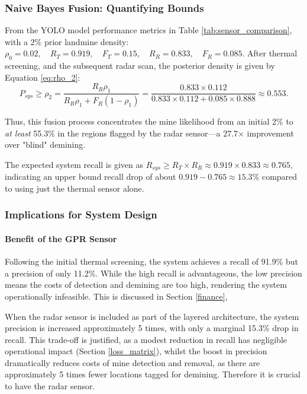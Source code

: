     \subsubsection{Naive Bayes Fusion: Quantifying Bounds}
    
        From the YOLO model performance metrics in Table \ref{tab:sensor_comparison}, with a 2\% prior landmine density: $\rho_0 = 0.02,\quad R_T = 0.919,\quad F_T = 0.15,\quad R_R = 0.833,\quad F_R = 0.085.$ After thermal screening, and the subsequent radar scan, the posterior density is given by Equation \ref{eq:rho_2}:
        \[
        P_{sys} \geq \rho_2 = \frac{R_R \rho_1}{R_R \rho_1 + F_R (1-\rho_1)} = \frac{0.833 \times 0.112}{0.833 \times 0.112 + 0.085 \times 0.888} \approx 0.553.
        \]
        
        Thus, this fusion process concentrates the mine likelihood from an initial 2\% to \textit{at least} 55.3\% in the regions flagged by the radar sensor—a  27.7× improvement over "blind" demining.
        
        The expected system recall is given as $R_{sys} \geq R_T \times R_R \approx 0.919 \times 0.833 \approx 0.765$, indicating an upper bound recall drop of about $0.919 - 0.765 \approx 15.3\%$ compared to using just the thermal sensor alone.


    \subsubsection{Implications for System Design}

        \paragraph{Benefit of the GPR Sensor}
        
            Following the initial thermal screening, the system achieves a recall of 91.9\% but a precision of only 11.2\%. While the high recall is advantageous, the low precision means the costs of detection and demining are too high, rendering the system operationally infeasible. This is discussed in Section \ref{finance},
            
            When the radar sensor is included as part of the layered architecture, the system precision is increased approximately 5 times, with only a marginal 15.3\% drop in recall. This trade-off is justified, as a modest reduction in recall has negligible operational impact (Section \ref{loss_matrix}), whilst the boost in precision dramatically reduces costs of mine detection and removal, as there are approximately 5 times fewer locations tagged for demining. Therefore it is crucial to have the radar sensor.
                
